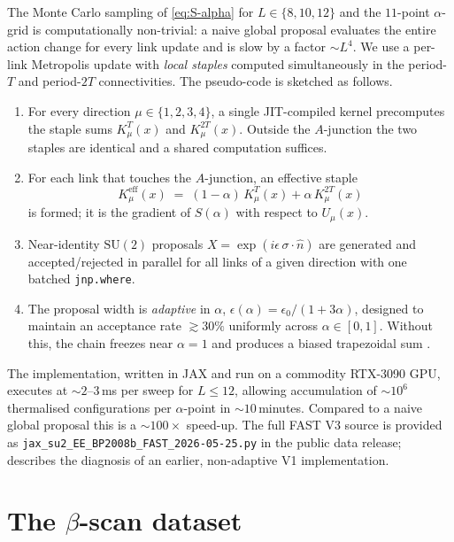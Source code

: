\documentclass[11pt,a4paper]{article}
\theoremstyle{definition}
\newcommand{\SUtwo}{\mathrm{SU}(2)}
\begin{document}
The Monte Carlo sampling of \eqref{eq:S-alpha} for $L\in\{8,10,12\}$
and the $11$-point $\alpha$-grid is computationally non-trivial: a
naive global proposal evaluates the entire action change for every
link update and is slow by a factor $\sim L^{4}$. We use a per-link
Metropolis update with \emph{local staples} computed simultaneously
in the period-$T$ and period-$2T$ connectivities. The pseudo-code is
sketched as follows.
\begin{enumerate}[leftmargin=*]
\item For every direction $\mu\in\{1,2,3,4\}$, a single JIT-compiled
      kernel precomputes the staple sums
      $K^{T}_{\mu}(x)$ and $K^{2T}_{\mu}(x)$. Outside the
      $A$-junction the two staples are identical and a shared
      computation suffices.
\item For each link that touches the $A$-junction, an effective
      staple
      \begin{equation}
        K^{\mathrm{eff}}_{\mu}(x) \;=\;
        (1-\alpha)\,K^{T}_{\mu}(x) + \alpha\,K^{2T}_{\mu}(x)
      \end{equation}
      is formed; it is the gradient of $S(\alpha)$ with respect to
      $U_{\mu}(x)$.
\item Near-identity $\SUtwo$ proposals
      $X = \exp(i\epsilon\,\sigma\!\cdot\!\hat n)$ are generated and
      accepted/rejected in parallel for all links of a given direction
      with one batched \verb!jnp.where!.
\item The proposal width is \emph{adaptive} in $\alpha$,
      $\epsilon(\alpha) = \epsilon_{0}/(1+3\alpha)$, designed to
      maintain an acceptance rate $\gtrsim 30\%$ uniformly across
      $\alpha\in[0,1]$. Without this, the chain freezes near
      $\alpha = 1$ and produces a biased trapezoidal sum
      \cite{KR2026-JHEP}.
\end{enumerate}

The implementation, written in JAX \cite{JAX2018} and run on a
commodity RTX-3090 GPU, executes at $\sim\!2$--$3$\,ms per sweep
for $L\le 12$, allowing accumulation of $\sim\!10^{6}$ thermalised
configurations per $\alpha$-point in $\sim\!10$\,minutes. Compared
to a naive global proposal this is a $\sim\!100\times$ speed-up. The full FAST V3 source is provided as
\verb!jax_su2_EE_BP2008b_FAST_2026-05-25.py! in the public data
release; \cite{KR2026-JHEP} describes the diagnosis of an earlier,
non-adaptive V1 implementation.


\section{The $\beta$-scan dataset}
\label{sec:dataset}
\end{document}
